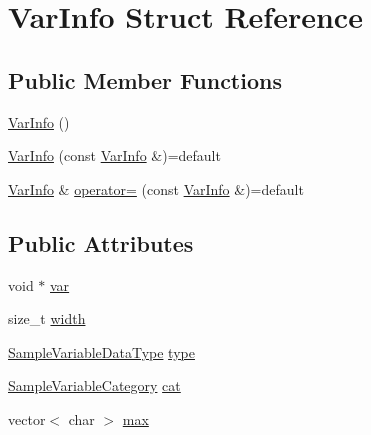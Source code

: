 \hypertarget{struct_var_info}{\section{Var\+Info Struct Reference}
\label{struct_var_info}
}
\subsection*{Public Member Functions}
\begin{DoxyCompactItemize}
\item 
\hyperlink{struct_var_info_a6a2d782951282a7daa0445e083ce7e7b}{Var\+Info} ()
\item 
\hyperlink{struct_var_info_a0cd0db27f8bbdd71225d274535ed257f}{Var\+Info} (const \hyperlink{struct_var_info}{Var\+Info} \&)=default
\item 
\hyperlink{struct_var_info}{Var\+Info} \& \hyperlink{struct_var_info_a14f3cbfe8efdb7da23826dbbcc3c8d6a}{operator=} (const \hyperlink{struct_var_info}{Var\+Info} \&)=default
\end{DoxyCompactItemize}
\subsection*{Public Attributes}
\begin{DoxyCompactItemize}
\item 
void $\ast$ \hyperlink{struct_var_info_a6d42af8892c0cecf33eaef2bde33bf66}{var}
\item 
size\+\_\+t \hyperlink{struct_var_info_ab17f8a2c7644b0b1ba932a0d903fcae1}{width}
\item 
\hyperlink{sampling_8h_aebe1c9f7e0bdb2dfac88bf77cf6c695e}{Sample\+Variable\+Data\+Type} \hyperlink{struct_var_info_a75acf394427435184ad8fdd1767fdecd}{type}
\item 
\hyperlink{sampling_8h_a3c74ca9dc5b22d369ebba2c024a08a71}{Sample\+Variable\+Category} \hyperlink{struct_var_info_ab7908e7f5d06494242aabee44f31dd80}{cat}
\item 
vector$<$ char $>$ \hyperlink{struct_var_info_a533eda90157edc0c1beff84d81cce719}{max}
\end{DoxyCompactItemize}


